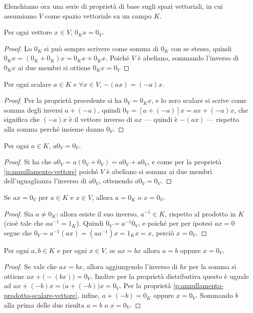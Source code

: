 Elenchiamo ora una serie di proprietà di base sugli spazi vettoriali, in cui assumiamo $V$ come spazio vettoriale su un campo $K$.
\begin{proprieta} \label{p:annullamento-vettore}
	Per ogni vettore $  x\in V$, $0_K  x=0_V$.
\end{proprieta}
\begin{proof}
	Lo $0_K$ si può sempre scrivere come somma di $0_K$ con se stesso, quindi $0_K  x=(0_K+0_K)  x=0_K  x+0_K  x$.
	Poiché $V$ è abeliano, sommando l'inverso di $0_K  x$ ai due membri si ottiene $0_K  x=0_V$
\end{proof}
\begin{proprieta} \label{p:scalare-opposto}
	Per ogni scalare $a\in K$ e $\forall  x\in V$, $-(a  x)=(-a)  x$.
\end{proprieta}
\begin{proof}
	Per la proprietà precedente si ha $0_V=0_K  x$, e lo zero scalare si scrive come somma degli inversi $a+(-a)$, quindi $0_V=[a+(-a)]  x=a  x+(-a)  x$, che significa che $(-a)  x$ è il vettore inverso di $a  x$ --- quindi è $-(a  x)$ --- rispetto alla somma perché insieme danno $0_V$.
\end{proof}
\begin{proprieta} \label{p:scalare-per-vettore-nullo}
	Per ogni $a\in K$, $a0_V=0_V$.
\end{proprieta}
\begin{proof}
	Si ha che $a0_V=a(0_V+0_V)=a0_V+a0_V$, e come per la proprietà \ref{p:annullamento-vettore} poiché $V$ è abeliano si somma ai due membri dell'uguaglianza l'inverso di $a0_V$, ottenendo $a0_V=0_V$.
\end{proof}
\begin{proprieta} \label{p:annullamento-prodotto-scalare-vettore}
	Se $a  x=0_V$ per $a\in K$ e $  x\in V$, allora $a=0_K$ o $  x=0_V$.
\end{proprieta}
\begin{proof}
	Sia $a\neq 0_K$: allora esiste il suo inverso, $a^{-1}\in K$, rispetto al prodotto in $K$ (cioè tale che $aa^{-1}=1_K$).
	Quindi $0_V=a^{-1}0_V$, e poiché per per ipotesi $a  x=0$ segue che $0_V=a^{-1}(a  x)=(aa^{-1})  x=1_K  x=  x$, perciò $  x=0_V$.
\end{proof}
\begin{proprieta} \label{p:cancellazione-vettore}
	Per ogni $a,b\in K$ e per ogni $  x\in V$, se $a  x=b  x$ allora $a=b$ oppure $  x=0_V$.
\end{proprieta}
\begin{proof}
	Se vale che $a  x=b  x$, allora aggiungendo l'inverso di $b  x$ per la somma si ottiene $a  x+\big(-(b  x)\big)=0_V$.
	Inoltre per la proprietà distributiva questo è uguale ad $a  x+(-b)  x=\big(a+(-b)\big)  x=0_V$.
	Per la proprietà \ref{p:annullamento-prodotto-scalare-vettore}, infine, $a+(-b)=0_K$ oppure $  x=0_V$.
	Sommando $b$ alla prima delle due risulta $a=b$ o $  x=0_V$.
\end{proof}
